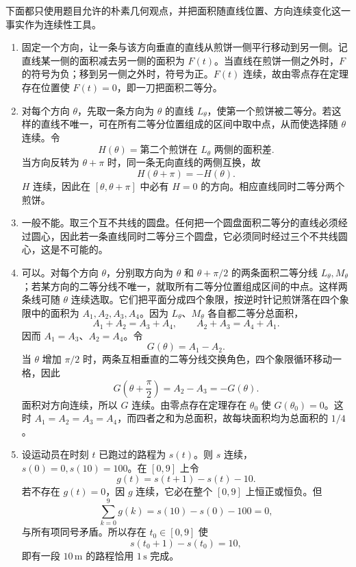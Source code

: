 \begin{xsolution}
下面都只使用题目允许的朴素几何观点，并把面积随直线位置、方向连续变化这一事实作为连续性工具。

\begin{enumerate}[label=(\arabic*)]
 \item 固定一个方向，让一条与该方向垂直的直线从煎饼一侧平行移动到另一侧。记直线某一侧的面积减去另一侧的面积为 $F(t)$。当直线在煎饼一侧之外时，$F$ 的符号为负；移到另一侧之外时，符号为正。$F(t)$ 连续，故由零点存在定理存在位置使 $F(t)=0$，即一刀把面积二等分。

 \item 对每个方向 $\theta$，先取一条方向为 $\theta$ 的直线 $L_\theta$，使第一个煎饼被二等分。若这样的直线不唯一，可在所有二等分位置组成的区间中取中点，从而使选择随 $\theta$ 连续。令
 \[
  H(\theta)=\text{第二个煎饼在 }L_\theta\text{ 两侧的面积差}.
 \]
 当方向反转为 $\theta+\pi$ 时，同一条无向直线的两侧互换，故
 \[
  H(\theta+\pi)=-H(\theta).
 \]
 $H$ 连续，因此在 $[\theta,\theta+\pi]$ 中必有 $H=0$ 的方向。相应直线同时二等分两个煎饼。

 \item 一般不能。取三个互不共线的圆盘。任何把一个圆盘面积二等分的直线必须经过圆心，因此若一条直线同时二等分三个圆盘，它必须同时经过三个不共线圆心，这是不可能的。

 \item 可以。对每个方向 $\theta$，分别取方向为 $\theta$ 和 $\theta+\pi/2$ 的两条面积二等分线 $L_\theta,M_\theta$；若某方向的二等分线不唯一，就取所有二等分位置组成区间的中点。这样两条线可随 $\theta$ 连续选取。它们把平面分成四个象限，按逆时针记煎饼落在四个象限中的面积为 $A_1,A_2,A_3,A_4$。因为 $L_\theta$、$M_\theta$ 各自都二等分总面积，
 \[
  A_1+A_2=A_3+A_4,
  \qquad
  A_2+A_3=A_4+A_1.
 \]
 因而 $A_1=A_3$、$A_2=A_4$。令
 \[
  G(\theta)=A_1-A_2.
 \]
 当 $\theta$ 增加 $\pi/2$ 时，两条互相垂直的二等分线交换角色，四个象限循环移动一格，因此
 \[
  G\left(\theta+\frac\pi2\right)=A_2-A_3=-G(\theta).
 \]
 面积对方向连续，所以 $G$ 连续。由零点存在定理存在 $\theta_0$ 使 $G(\theta_0)=0$。这时 $A_1=A_2=A_3=A_4$，而四者之和为总面积，故每块面积均为总面积的 $1/4$。

 \item 设运动员在时刻 $t$ 已跑过的路程为 $s(t)$。则 $s$ 连续，$s(0)=0,s(10)=100$。在 $[0,9]$ 上令
 \[
  g(t)=s(t+1)-s(t)-10.
 \]
 若不存在 $g(t)=0$，因 $g$ 连续，它必在整个 $[0,9]$ 上恒正或恒负。但
 \[
  \sum_{k=0}^{9}g(k)
  =s(10)-s(0)-100=0,
 \]
 与所有项同号矛盾。所以存在 $t_0\in[0,9]$ 使
 \[
  s(t_0+1)-s(t_0)=10,
 \]
 即有一段 $10\,\mathrm m$ 的路程恰用 $1\,\mathrm s$ 完成。


\end{enumerate}
\end{xsolution}
